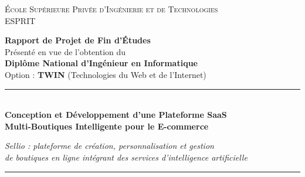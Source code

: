 
\begin{titlepage}
\thispagestyle{empty}

\begin{center}

\begin{minipage}{0.3\textwidth}
\raggedright
{}
\end{minipage}
\hfill
\begin{minipage}{0.3\textwidth}
\raggedleft
{}
\end{minipage}

\vspace{1.2cm}

{\large \textsc{École Supérieure Privée d'Ingénierie et de Technologies}}\\[0.2cm]
{\large ESPRIT}

\vspace{1.2cm}

{\Large \textbf{Rapport de Projet de Fin d'Études}}\\[0.3cm]

{\large Présenté en vue de l'obtention du}\\[0.2cm]

{\large \textbf{Diplôme National d'Ingénieur en Informatique}}\\[0.2cm]

{\large Option : \textbf{TWIN} (Technologies du Web et de l'Internet)}

\vspace{1.2cm}

\rule{\textwidth}{1.2pt}\\[0.5cm]

{\LARGE
\textbf{
Conception et Développement d'une Plateforme SaaS\\[0.25cm]
Multi-Boutiques Intelligente pour le E-commerce
}
}

\vspace{0.5cm}

{\large
\textit{
Sellio : plateforme de création, personnalisation et gestion\\
de boutiques en ligne intégrant des services d'intelligence artificielle
}
}

\vspace{0.4cm}

\rule{\textwidth}{1.2pt}


\end{center}
\end{titlepage}
